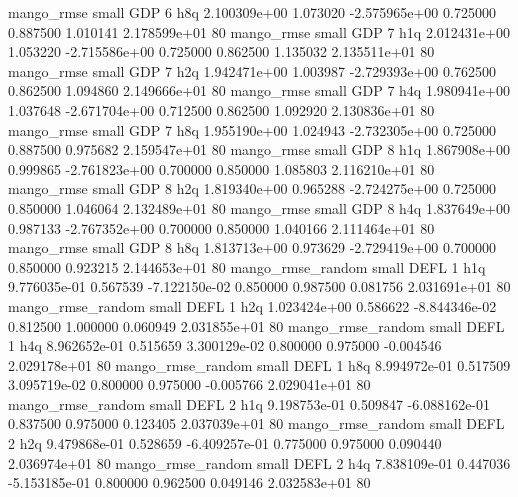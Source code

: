        mango_rmse      small      GDP                 6                  h8q 2.100309e+00      1.073020 -2.575965e+00 0.725000 0.887500       1.010141 2.178599e+01 80
       mango_rmse      small      GDP                 7                  h1q 2.012431e+00      1.053220 -2.715586e+00 0.725000 0.862500       1.135032 2.135511e+01 80
       mango_rmse      small      GDP                 7                  h2q 1.942471e+00      1.003987 -2.729393e+00 0.762500 0.862500       1.094860 2.149666e+01 80
       mango_rmse      small      GDP                 7                  h4q 1.980941e+00      1.037648 -2.671704e+00 0.712500 0.862500       1.092920 2.130836e+01 80
       mango_rmse      small      GDP                 7                  h8q 1.955190e+00      1.024943 -2.732305e+00 0.725000 0.887500       0.975682 2.159547e+01 80
       mango_rmse      small      GDP                 8                  h1q 1.867908e+00      0.999865 -2.761823e+00 0.700000 0.850000       1.085803 2.116210e+01 80
       mango_rmse      small      GDP                 8                  h2q 1.819340e+00      0.965288 -2.724275e+00 0.725000 0.850000       1.046064 2.132489e+01 80
       mango_rmse      small      GDP                 8                  h4q 1.837649e+00      0.987133 -2.767352e+00 0.700000 0.850000       1.040166 2.111464e+01 80
       mango_rmse      small      GDP                 8                  h8q 1.813713e+00      0.973629 -2.729419e+00 0.700000 0.850000       0.923215 2.144653e+01 80
mango_rmse_random      small     DEFL                 1                  h1q 9.776035e-01      0.567539 -7.122150e-02 0.850000 0.987500       0.081756 2.031691e+01 80
mango_rmse_random      small     DEFL                 1                  h2q 1.023424e+00      0.586622 -8.844346e-02 0.812500 1.000000       0.060949 2.031855e+01 80
mango_rmse_random      small     DEFL                 1                  h4q 8.962652e-01      0.515659  3.300129e-02 0.800000 0.975000      -0.004546 2.029178e+01 80
mango_rmse_random      small     DEFL                 1                  h8q 8.994972e-01      0.517509  3.095719e-02 0.800000 0.975000      -0.005766 2.029041e+01 80
mango_rmse_random      small     DEFL                 2                  h1q 9.198753e-01      0.509847 -6.088162e-01 0.837500 0.975000       0.123405 2.037039e+01 80
mango_rmse_random      small     DEFL                 2                  h2q 9.479868e-01      0.528659 -6.409257e-01 0.775000 0.975000       0.090440 2.036974e+01 80
mango_rmse_random      small     DEFL                 2                  h4q 7.838109e-01      0.447036 -5.153185e-01 0.800000 0.962500       0.049146 2.032583e+01 80
